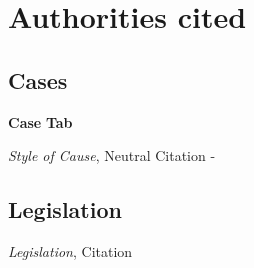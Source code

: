 \section{Authorities cited}
\subsection{Cases}

\textbf{Case} \hfill \textbf{Tab}

\textit{Style of Cause}, Neutral Citation \hfill -

\subsection{Legislation}

\quad \textit{Legislation}, Citation